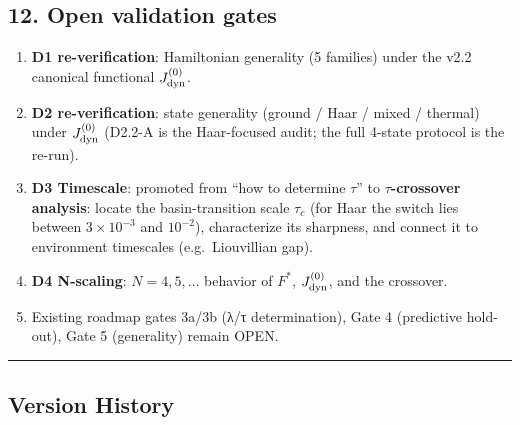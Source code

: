 \documentclass[
]{article}
\providecommand{\tightlist}{%
  \setlength{\itemsep}{0pt}\setlength{\parskip}{0pt}}
\begin{document}
\subsection{12. Open validation gates}\label{open-validation-gates}

\begin{enumerate}
\def\labelenumi{\arabic{enumi}.}
\tightlist
\item
  \textbf{D1 re-verification}: Hamiltonian generality (5 families) under
  the v2.2 canonical functional \(J_{\rm dyn}^{(0)}\).
\item
  \textbf{D2 re-verification}: state generality (ground / Haar / mixed /
  thermal) under \(J_{\rm dyn}^{(0)}\) (D2.2-A is the Haar-focused
  audit; the full 4-state protocol is the re-run).
\item
  \textbf{D3 Timescale}: promoted from ``how to determine \(\tau\)'' to
  \textbf{\(\tau\)-crossover analysis}: locate the basin-transition
  scale \(\tau_c\) (for Haar the switch lies between \(3\times10^{-3}\)
  and \(10^{-2}\)), characterize its sharpness, and connect it to
  environment timescales (e.g.~Liouvillian gap).
\item
  \textbf{D4 N-scaling}: \(N=4,5,\ldots\) behavior of \(F^*\),
  \(J_{\rm dyn}^{(0)}\), and the crossover.
\item
  Existing roadmap gates 3a/3b (λ/τ determination), Gate 4 (predictive
  hold-out), Gate 5 (generality) remain OPEN.
\end{enumerate}

\begin{center}\rule{0.5\linewidth}{0.5pt}\end{center}

\subsection{Version History}\label{version-history}
\end{document}
